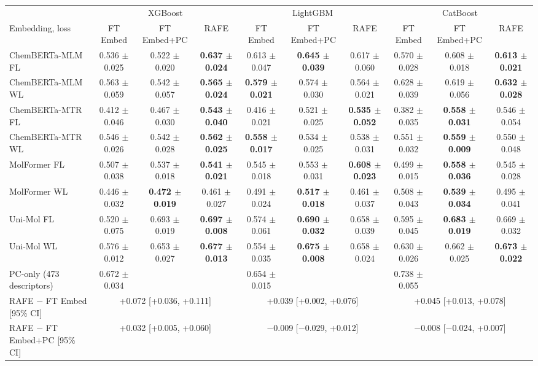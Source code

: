 \begin{tabular}{@{}lccccccccc@{}}
\toprule
 & \multicolumn{3}{c}{XGBoost} & \multicolumn{3}{c}{LightGBM} & \multicolumn{3}{c}{CatBoost} \\
\cmidrule(lr){2-4} \cmidrule(lr){5-7} \cmidrule(lr){8-10}
Embedding, loss & FT Embed & FT Embed+PC & RAFE & FT Embed & FT Embed+PC & RAFE & FT Embed & FT Embed+PC & RAFE \\
\midrule
ChemBERTa-MLM FL & 0.536 $\pm$ 0.025 & 0.522 $\pm$ 0.020 & \textbf{0.637 $\pm$ 0.024} & 0.613 $\pm$ 0.047 & \textbf{0.645 $\pm$ 0.039} & 0.617 $\pm$ 0.060 & 0.570 $\pm$ 0.028 & 0.608 $\pm$ 0.018 & \textbf{0.613 $\pm$ 0.021} \\
ChemBERTa-MLM WL & 0.563 $\pm$ 0.059 & 0.542 $\pm$ 0.057 & \textbf{0.565 $\pm$ 0.024} & \textbf{0.579 $\pm$ 0.021} & 0.574 $\pm$ 0.030 & 0.564 $\pm$ 0.021 & 0.628 $\pm$ 0.039 & 0.619 $\pm$ 0.056 & \textbf{0.632 $\pm$ 0.028} \\
ChemBERTa-MTR FL & 0.412 $\pm$ 0.046 & 0.467 $\pm$ 0.030 & \textbf{0.543 $\pm$ 0.040} & 0.416 $\pm$ 0.021 & 0.521 $\pm$ 0.025 & \textbf{0.535 $\pm$ 0.052} & 0.382 $\pm$ 0.035 & \textbf{0.558 $\pm$ 0.031} & 0.546 $\pm$ 0.054 \\
ChemBERTa-MTR WL & 0.546 $\pm$ 0.026 & 0.542 $\pm$ 0.028 & \textbf{0.562 $\pm$ 0.025} & \textbf{0.558 $\pm$ 0.017} & 0.534 $\pm$ 0.025 & 0.538 $\pm$ 0.031 & 0.551 $\pm$ 0.032 & \textbf{0.559 $\pm$ 0.009} & 0.550 $\pm$ 0.048 \\
MolFormer FL & 0.507 $\pm$ 0.038 & 0.537 $\pm$ 0.018 & \textbf{0.541 $\pm$ 0.021} & 0.545 $\pm$ 0.018 & 0.553 $\pm$ 0.031 & \textbf{0.608 $\pm$ 0.023} & 0.499 $\pm$ 0.015 & \textbf{0.558 $\pm$ 0.036} & 0.545 $\pm$ 0.028 \\
MolFormer WL & 0.446 $\pm$ 0.032 & \textbf{0.472 $\pm$ 0.019} & 0.461 $\pm$ 0.027 & 0.491 $\pm$ 0.024 & \textbf{0.517 $\pm$ 0.018} & 0.461 $\pm$ 0.037 & 0.508 $\pm$ 0.043 & \textbf{0.539 $\pm$ 0.034} & 0.495 $\pm$ 0.041 \\
Uni-Mol FL & 0.520 $\pm$ 0.075 & 0.693 $\pm$ 0.019 & \textbf{0.697 $\pm$ 0.008} & 0.574 $\pm$ 0.061 & \textbf{0.690 $\pm$ 0.032} & 0.658 $\pm$ 0.039 & 0.595 $\pm$ 0.045 & \textbf{0.683 $\pm$ 0.019} & 0.669 $\pm$ 0.032 \\
Uni-Mol WL & 0.576 $\pm$ 0.012 & 0.653 $\pm$ 0.027 & \textbf{0.677 $\pm$ 0.013} & 0.554 $\pm$ 0.035 & \textbf{0.675 $\pm$ 0.008} & 0.658 $\pm$ 0.024 & 0.630 $\pm$ 0.026 & 0.662 $\pm$ 0.025 & \textbf{0.673 $\pm$ 0.022} \\
\midrule
PC-only (473 descriptors) & 0.672 $\pm$ 0.034 &  &  & 0.654 $\pm$ 0.015 &  &  & 0.738 $\pm$ 0.055 &  &  \\
RAFE $-$ FT Embed [95\% CI] & \multicolumn{3}{c}{+0.072 [+0.036, +0.111]} & \multicolumn{3}{c}{+0.039 [+0.002, +0.076]} & \multicolumn{3}{c}{+0.045 [+0.013, +0.078]} \\
RAFE $-$ FT Embed+PC [95\% CI] & \multicolumn{3}{c}{+0.032 [+0.005, +0.060]} & \multicolumn{3}{c}{$-$0.009 [$-$0.029, +0.012]} & \multicolumn{3}{c}{$-$0.008 [$-$0.024, +0.007]} \\
\bottomrule
\end{tabular}
